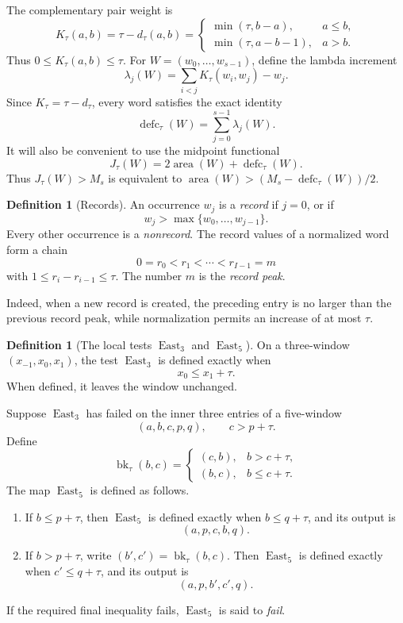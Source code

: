 \documentclass[11pt]{article}
\theoremstyle{definition}
\newtheorem{definition}[theorem]{Definition}
\theoremstyle{remark}
\newcommand{\area}{\operatorname{area}}
\newcommand{\defc}{\operatorname{defc}}
\newcommand{\East}{\operatorname{East}}
\newcommand{\bk}{\operatorname{bk}}
\begin{document}
The complementary pair weight is
\[
  K_\tau(a,b)=\tau-d_\tau(a,b)
  =
  \begin{cases}
    \min(\tau,b-a),&a\le b,\\[2mm]
    \min(\tau,a-b-1),&a>b.
  \end{cases}
\]
Thus \(0\le K_\tau(a,b)\le\tau\).  For
\(W=(w_0,\ldots,w_{s-1})\), define the lambda increment
\[
  \lambda_j(W)=\sum_{i<j}K_\tau(w_i,w_j)-w_j.
\]
Since \(K_\tau=\tau-d_\tau\), every word satisfies the exact identity
\begin{equation}
  \defc_\tau(W)=\sum_{j=0}^{s-1}\lambda_j(W).
  \label{eq:defect-lambda}
\end{equation}
It will also be convenient to use the midpoint functional
\[
  J_\tau(W)=2\area(W)+\defc_\tau(W).
\]
Thus \(J_\tau(W)>M_s\) is equivalent to
\(\area(W)>(M_s-\defc_\tau(W))/2\).

\begin{definition}[Records]
An occurrence \(w_j\) is a \emph{record} if \(j=0\), or if
\[
  w_j>\max\{w_0,\ldots,w_{j-1}\}.
\]
Every other occurrence is a \emph{nonrecord}.  The record values of a
normalized word form a chain
\[
  0=r_0<r_1<\cdots<r_{I-1}=m
\]
with \(1\le r_i-r_{i-1}\le\tau\).  The number \(m\) is the
\emph{record peak}.
\end{definition}

Indeed, when a new record is created, the preceding entry is no larger
than the previous record peak, while normalization permits an increase of
at most \(\tau\).

\begin{definition}[The local tests \(\East_3\) and \(\East_5\)]
On a three-window \((x_{-1},x_0,x_1)\), the test \(\East_3\) is defined
exactly when
\[
  x_0\le x_1+\tau.
\]
When defined, it leaves the window unchanged.

Suppose \(\East_3\) has failed on the inner three entries of a five-window
\[
  (a,b,c,p,q),
  \qquad c>p+\tau.
\]
Define
\[
  \bk_\tau(b,c)=
  \begin{cases}
    (c,b),&b>c+\tau,\\
    (b,c),&b\le c+\tau.
  \end{cases}
\]
The map \(\East_5\) is defined as follows.
\begin{enumerate}[label=\textup{(\alph*)}]
  \item If \(b\le p+\tau\), then \(\East_5\) is defined exactly when
  \(b\le q+\tau\), and its output is
  \[
    (a,p,c,b,q).
  \]
  \item If \(b>p+\tau\), write
  \((b',c')=\bk_\tau(b,c)\).  Then \(\East_5\) is defined exactly when
  \(c'\le q+\tau\), and its output is
  \[
    (a,p,b',c',q).
  \]
\end{enumerate}
If the required final inequality fails, \(\East_5\) is said to
\emph{fail}.
\end{definition}
\end{document}
